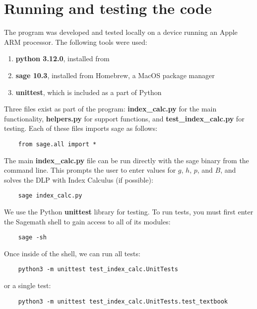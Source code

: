 \documentclass[]{math_paper}
\begin{document}
\section{Running and testing the code} \label{sec:example}
The program was developed and tested locally on a device running an Apple ARM processor. The following tools were used:
\begin{enumerate}
    \item \textbf{python 3.12.0}, installed from \cite{Python}
    \item \textbf{sage 10.3}, installed from Homebrew, a MacOS package manager \cite{Homebrew}
    \item \textbf{unittest}, which is included as a part of Python
\end{enumerate}
Three files exist as part of the program: \textbf{index\_calc.py} for the main functionality, \textbf{helpers.py} for support functions, and \textbf{test\_index\_calc.py} for testing. Each of these files imports sage as follows:
\begin{lstlisting}
    from sage.all import *
\end{lstlisting}
The main \textbf{index\_calc.py} file can be run directly with the sage binary from the command line. This prompts the user to enter values for $g$, $h$, $p$, and $B$, and solves the DLP with Index Calculus (if possible):
\begin{lstlisting}
    sage index_calc.py
\end{lstlisting}
We use the Python \textbf{unittest} library for testing. To run tests, you must first enter the Sagemath shell to gain access to all of its modules:
\begin{lstlisting}
    sage -sh
\end{lstlisting}
Once inside of the shell, we can run all tests:
\begin{lstlisting}
    python3 -m unittest test_index_calc.UnitTests
\end{lstlisting}
or a single test:
\begin{lstlisting}
    python3 -m unittest test_index_calc.UnitTests.test_textbook
\end{lstlisting}




\appendix
\end{document}
